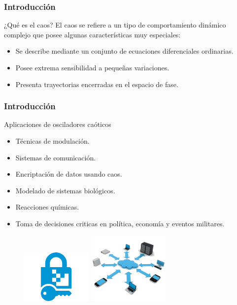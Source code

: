 \documentclass[10pt]{beamer}
\begin{document}
	\begin{frame}
		\frametitle{Introducción}
		\begin{block}{¿Qué es el caos?}
		\justifying
			El caos se refiere a un tipo de comportamiento dinámico complejo que posee algunas características muy especiales:
			\begin{itemize}
				\item Se describe mediante un conjunto de ecuaciones diferenciales ordinarias.
				\item Posee extrema sensibilidad a pequeñas variaciones.
				\item Presenta trayectorias encerradas en el espacio de fase.
			\end{itemize}
		\end{block}
	\end{frame}	
	
	
		\begin{frame}
		\frametitle{Introducción}
		\begin{block}{Aplicaciones de osciladores caóticos}
			\begin{itemize}
				\item Técnicas de modulación.
				\item Sistemas de comunicación.
				\item Encriptación de datos usando caos.
				\item Modelado de sistemas biológicos.
				\item Reacciones químicas.
				\item Toma de decisiones criticas en política, economía y eventos militares.
				\end{itemize}
		\end{block}
		
\begin{figure}[!h]
	\begin{minipage}[c]{0.45\textwidth}
		\centering
		\includegraphics[width = 3.5cm]{encrypt.png}
	\end{minipage} \hfill \begin{minipage}[c]{0.45\textwidth}
		\centering
		\includegraphics[width = 4cm]{comunication.png}
	\end{minipage}
\end{figure}
	\end{frame}
\end{document}
